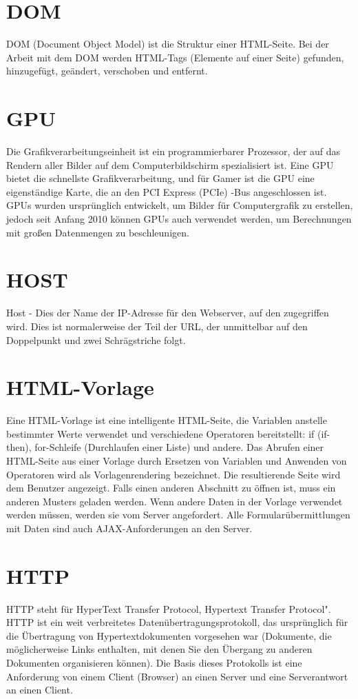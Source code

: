 \section*{DOM}
\label{sec:appendix:dom}
DOM (Document Object Model) ist die Struktur einer HTML-Seite. Bei der Arbeit mit dem DOM werden HTML-Tags (Elemente auf einer Seite) gefunden, hinzugefügt, geändert, verschoben und entfernt.

\section*{GPU}
\label{sec:appendix:gpu}
Die Grafikverarbeitungseinheit ist ein programmierbarer Prozessor, der auf das Rendern aller Bilder auf dem Computerbildschirm spezialisiert ist. Eine GPU bietet die schnellste Grafikverarbeitung, und für Gamer ist die GPU eine eigenständige Karte, die an den PCI Express (PCIe) -Bus angeschlossen ist. GPUs wurden ursprünglich entwickelt, um Bilder für Computergrafik zu erstellen, jedoch seit Anfang 2010 können GPUs auch verwendet werden, um Berechnungen mit großen Datenmengen zu beschleunigen.

\section*{HOST}
\label{sec:appendix:host}
Host - Dies  der Name der IP-Adresse für den Webserver, auf den zugegriffen wird. Dies ist normalerweise der Teil der URL, der unmittelbar auf den Doppelpunkt und zwei Schrägstriche folgt.\cite[p.31]{shklar:webapplication} 

\section*{HTML-Vorlage}
\label{sec:appendix:html}
Eine HTML-Vorlage ist eine intelligente HTML-Seite, die Variablen anstelle bestimmter Werte verwendet und verschiedene Operatoren bereitstellt: if (if-then), for-Schleife (Durchlaufen einer Liste) und andere. Das Abrufen einer HTML-Seite aus einer Vorlage durch Ersetzen von Variablen und Anwenden von Operatoren wird als Vorlagenrendering bezeichnet. Die resultierende Seite wird dem Benutzer angezeigt. Falls einen anderen Abschnitt zu öffnen ist, muss ein anderen Musters geladen werden. Wenn andere Daten in der Vorlage verwendet werden müssen, werden sie vom Server angefordert. Alle Formularübermittlungen mit Daten sind auch AJAX-Anforderungen an den Server.

\section*{HTTP}
\label{sec:appendix:http}
HTTP steht für HyperText Transfer Protocol, Hypertext Transfer Protocol". HTTP ist ein weit verbreitetes Datenübertragungsprotokoll, das ursprünglich für die Übertragung von Hypertextdokumenten vorgesehen war (Dokumente, die möglicherweise Links enthalten, mit denen Sie den Übergang zu anderen Dokumenten organisieren können). Die Basis dieses Protokolls ist eine Anforderung von einem Client (Browser) an einen Server und eine Serverantwort an einen Client.

